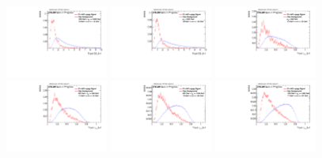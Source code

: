 \begin{figure}[H]
\includegraphics[width=0.3\textwidth]{sascha_input/Appendix/Distributions/w/distributions/beta1/h_normal_tj_D2_bin5.pdf} \hspace{1mm}
\includegraphics[width=0.3\textwidth]{sascha_input/Appendix/Distributions/w/distributions/beta1/h_normal_tj_D2_bin6.pdf}
\bigskip
\includegraphics[width=0.3\textwidth]{sascha_input/Appendix/Distributions/w/distributions/beta1/h_normal_tj_nSub21_bin1.pdf} \hspace{1mm}
\includegraphics[width=0.3\textwidth]{sascha_input/Appendix/Distributions/w/distributions/beta1/h_normal_tj_nSub21_bin2.pdf} \hspace{1mm}
\includegraphics[width=0.3\textwidth]{sascha_input/Appendix/Distributions/w/distributions/beta1/h_normal_tj_nSub21_bin3.pdf} 
\bigskip
\includegraphics[width=0.3\textwidth]{sascha_input/Appendix/Distributions/w/distributions/beta1/h_normal_tj_nSub21_bin4.pdf} \hspace{6mm}

\end{figure}
